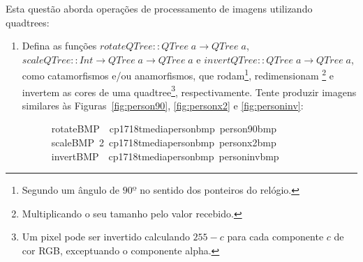 \documentclass[a4paper]{article}
\newcommand{\Conid}[1]{\mathit{#1}}
\newcommand{\Varid}[1]{\mathit{#1}}
\begin{document}
Esta questão aborda operações de processamento de imagens utilizando quadtrees:
\begin{enumerate}
    \item Defina as funções \ensuremath{\Varid{rotateQTree}\mathbin{::}\Conid{QTree}\;\Varid{a}\to \Conid{QTree}\;\Varid{a}}, \ensuremath{\Varid{scaleQTree}\mathbin{::}\Conid{Int}\to \Conid{QTree}\;\Varid{a}\to \Conid{QTree}\;\Varid{a}} e \ensuremath{\Varid{invertQTree}\mathbin{::}\Conid{QTree}\;\Varid{a}\to \Conid{QTree}\;\Varid{a}}, como catamorfismos e/ou anamorfismos, que rodam\footnote{Segundo um ângulo de $90º$ no sentido dos ponteiros do relógio.}, redimensionam \footnote{Multiplicando o seu tamanho pelo valor recebido.} e invertem as cores de uma quadtree\footnote{Um pixel pode ser invertido calculando $255 - c$ para cada componente $c$ de cor RGB, exceptuando o componente alpha.}, respectivamente.
    Tente produzir imagens similares às Figuras~\ref{fig:person90}, \ref{fig:personx2} e \ref{fig:personinv}:
        \begin{tabbing}\ttfamily
~~~~~~rotateBMP~~cp1718tmediapersonbmp~person90bmp\\
\ttfamily ~~~~~~scaleBMP~2~cp1718tmediapersonbmp~personx2bmp\\
\ttfamily ~~~~~~invertBMP~~cp1718tmediapersonbmp~personinvbmp
\end{tabbing}


\end{enumerate}
\end{document}

